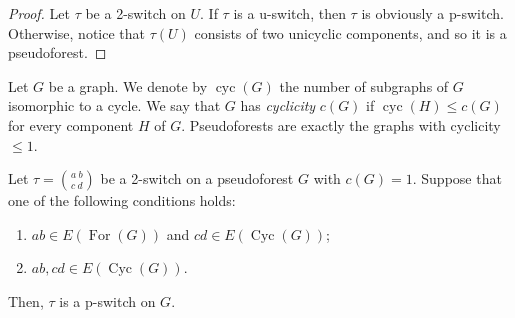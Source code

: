 \documentclass{BICA}
\newcommand{\cycles}{\operatorname{cyc}}
\newcommand{\Forest}{\operatorname{For}}
\newcommand{\Cycles}{\operatorname{Cyc}}
\begin{document}
\begin{proof}
	Let $\tau$ be a 2-switch on $U$. If $\tau$ is a u-switch, then $\tau$ is obviously a p-switch. Otherwise, notice that $\tau(U)$ consists of two unicyclic components, and so it is a pseudoforest.
\end{proof}

Let $G$ be a graph. We denote by $\cycles(G)$ the number of subgraphs of $G$ isomorphic to a cycle. We say that $G$ has \emph{cyclicity} $c(G)$ if $\cycles(H)\leq c(G)$ for every component $H$ of $G$. Pseudoforests are exactly the graphs with cyclicity $\leq 1$.

\begin{lemma}
	\label{lema2switchpswitch}
	Let $\tau= {{a \ b}\choose{c \ d}}$ be a 2-switch on a pseudoforest $G$ with $c(G)=1$. Suppose that one of the following conditions holds:
	\begin{enumerate}
		\item $ab\in E(\Forest(G))$ and $cd\in E(\Cycles(G))$;

		\item $ab,cd\in E(\Cycles(G))$.
	\end{enumerate}
	Then, $\tau$ is a p-switch on $G$.
\end{lemma}
\end{document}
